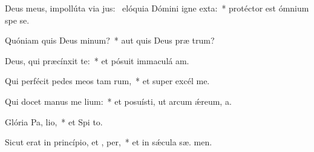 \item Deus meus, impollúta via jus:~\pscross{} elóquia Dómini igne exta:~* protéctor est ómnium spe  se.
\item Quóniam quis Deus  minum?~* aut quis Deus præ  trum?
\item Deus, qui præcínxit  te:~* et pósuit immaculá  am.
\item Qui perfécit pedes meos tam rum,~* et super excél  me.
\item Qui docet manus me  lium:~* et posuísti, ut arcum ǽreum,  a.
\item Glória Pa,  lio,~* et Spi to.
\item Sicut erat in princípio, et ,  per,~* et in sǽcula sæ. men.
